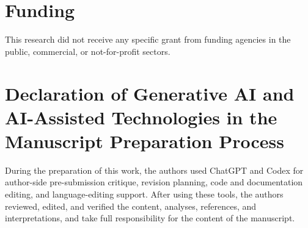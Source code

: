 \documentclass[authoryear]{elsarticle}
\begin{document}
\section*{Funding}
This research did not receive any specific grant from funding agencies in the public, commercial, or not-for-profit sectors.

\section*{Declaration of Generative AI and AI-Assisted Technologies in the Manuscript Preparation Process}
During the preparation of this work, the authors used ChatGPT and Codex for author-side pre-submission critique, revision planning, code and documentation editing, and language-editing support. After using these tools, the authors reviewed, edited, and verified the content, analyses, references, and interpretations, and take full responsibility for the content of the manuscript.


\end{document}

